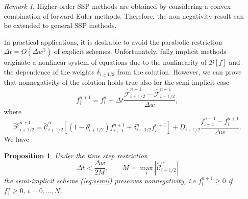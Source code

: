 \documentclass[a4paper]{article}
\newtheorem{proposition}{Proposition}
\theoremstyle{remark}\newtheorem{remark}{Remark}
\newcommand{\F}{\mathcal{F}}
\newcommand{\B}{\mathcal{B}}
\newcommand{\C}{\mathcal{C}}
\newcommand{\be}{\begin{equation}}
\newcommand{\ee}{\end{equation}}
\begin{document}
\begin{remark}
Higher order SSP methods {\rm \cite{GST}} are obtained by considering a convex combination of forward Euler methods. Therefore, the non negativity result can be extended to general SSP methods. 
\end{remark}
In practical applications, it is desirable to avoid the parabolic restriction $\Delta t = O(\Delta w^2)$ of explicit schemes. Unfortunately, fully implicit methods originate a nonlinear system of equations due to the nonlinearity of $\B[f]$ and the dependence of the weights $\delta_{i\pm 1/2}$ from the solution. However, we can prove that nonnegativity of the solution holds true also for the semi-implicit case
\be
f^{n+1}_i=f^n_i + \Delta t \dfrac{\hat{\F}_{i+1/2}^{n+1}-\hat{\F}_{i-1/2}^{n+1}}{\Delta w},
\label{eq:semi}
\ee
where
\be
\hat{\F}_{i+1/2}^{n+1}= \tilde{\C}_{i+1/2}^n \left[ (1-\delta_{i+1/2}^n)f_{i+1}^{n+1}+\delta^n_{i+1/2}f_i^{n+1} \right]+D_{i+1/2}\dfrac{f_{i+1}^{n+1}-f_i^{n+1}}{\Delta w}.
\ee
We have 
\begin{proposition}\label{prop:semiimplicit_CFL}
Under the time step restriction 
\be\label{eq:time_step_implicit}
\Delta t< \dfrac{\Delta w}{2M},\qquad M = \max_{i}|\tilde{\C}^n_{i+1/2}|
\ee
the semi-implicit scheme (\ref{eq:semi}) preserves nonnegativity, i.e 
$ f^{n+1}_i\ge 0$ if $f^n_i\ge 0$, $i=0,\dots,N$.
\label{prop:semi} 
\end{proposition}
\end{document}
